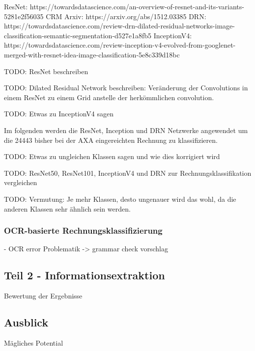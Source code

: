 ResNet: https://towardsdatascience.com/an-overview-of-resnet-and-its-variants-5281e2f56035
CRM Arxiv: https://arxiv.org/abs/1512.03385
DRN: https://towardsdatascience.com/review-drn-dilated-residual-networks-image-classification-semantic-segmentation-d527e1a8fb5
InceptionV4: https://towardsdatascience.com/review-inception-v4-evolved-from-googlenet-merged-with-resnet-idea-image-classification-5e8c339d18bc

TODO: ResNet beschreiben

TODO: Dilated Residual Network beschreiben: Veränderung der Convolutions in einem ResNet zu einem Grid anstelle der herkömmlichen convolution.

TODO: Etwas zu InceptionV4 sagen

Im folgenden werden die ResNet, Inception und DRN Netzwerke angewendet um die 24443 bisher bei der AXA eingereichten Rechnung zu klassifizieren.

TODO: Etwas zu ungleichen Klassen sagen und wie dies korrigiert wird

TODO: ResNet50, ResNet101, InceptionV4 und DRN zur Rechnungsklassifikation vergleichen


TODO: Vermutung: Je mehr Klassen, desto ungenauer wird das wohl, da die anderen Klassen sehr ähnlich sein werden.

\subsubsection{OCR-basierte Rechnungsklassifizierung}

- OCR error Problematik -> grammar check vorschlag


\subsection{Teil 2 - Informationsextraktion}

Bewertung der Ergebnisse

\subsection{Ausblick}

Mägliches Potential

